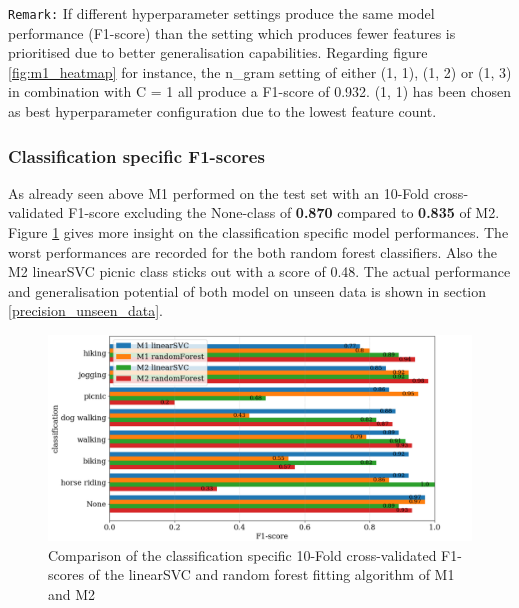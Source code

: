 \texttt{Remark:} If different hyperparameter settings produce the same model performance (F1-score) than the setting which produces fewer features is prioritised due to better generalisation capabilities. Regarding figure \ref{fig:m1_heatmap} for instance, the n\_gram setting of either (1, 1), (1, 2) or (1, 3) in combination with C = 1 all produce a F1-score of 0.932. (1, 1) has been chosen as best hyperparameter configuration due to the lowest feature count.

\subsubsection{Classification specific F1-scores}
As already seen above M1 performed on the test set with an 10-Fold cross-validated F1-score excluding the None-class of \textbf{0.870} compared to \textbf{0.835} of M2. Figure \ref{fig:m1_m2_class_f1_scores} gives more insight on the classification specific model performances. The worst performances are recorded for the both random forest classifiers. Also the M2 linearSVC picnic class sticks out with a score of 0.48. The actual performance and generalisation potential of both model on unseen data is shown in section \ref{precision_unseen_data}.
\begin{figure}[h!]
   \centering
   \includegraphics[width=\textwidth]{img/m1_m2_class_f1_scores_bigger_font.pdf}
   \caption{Comparison of the classification specific 10-Fold cross-validated F1-scores of the linearSVC and random forest fitting algorithm of M1 and M2}
   \label{fig:m1_m2_class_f1_scores}
\end{figure}


